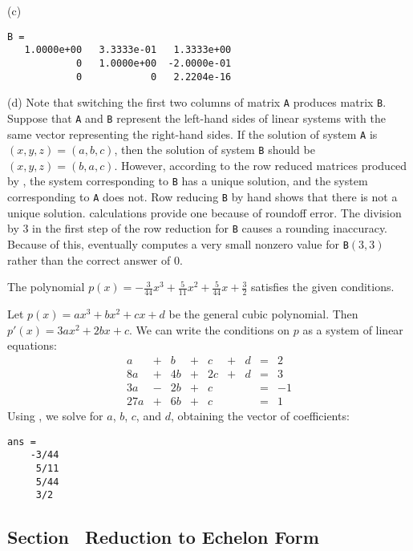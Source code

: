 \documentclass{ximera}
\begin{document}
(c)
\begin{verbatim}
B =
   1.0000e+00   3.3333e-01   1.3333e+00
            0   1.0000e+00  -2.0000e-01
            0            0   2.2204e-16
\end{verbatim}


(d) Note that switching the first two columns of matrix {\tt A} produces
matrix {\tt B}.  Suppose that {\tt A} and {\tt B} represent the left-hand
sides of linear systems with the same vector representing the right-hand
sides.  If the solution of system {\tt A} is $(x,y,z) = (a,b,c)$, then the
solution of system {\tt B} should be $(x,y,z) = (b,a,c)$.  However,
according to the row reduced matrices produced by \Matlab, the system
corresponding to {\tt B} has a unique solution, and the system
corresponding to {\tt A} does not.  Row reducing {\tt B} by hand shows
that there is not a unique solution.  \Matlab calculations provide one because of 
roundoff error.  The division by 3 in the first step of the row reduction
for {\tt B} causes a rounding inaccuracy.  Because of this, \Matlab
eventually computes a very small nonzero value for {\tt B}$(3,3)$
rather than the correct answer of 0.

\ans The polynomial $p(x) = -\frac{3}{44}x^3 + \frac{5}{11}x^2 +
\frac{5}{44}x + \frac{3}{2}$ satisfies the given conditions.

\soln Let $p(x) = ax^3 + bx^2 + cx + d$ be the general cubic polynomial. 
Then $p'(x) = 3ax^2 + 2bx + c$.  We can write the conditions on $p$ as a
system of linear equations:
\[
\begin{array}{rrrrrrrrr}
a & + & b & + & c & + & d & = & 2 \\
8a & + & 4b & + & 2c & + & d & = & 3 \\
3a & - & 2b & + & c & & & = & -1 \\
27a & + & 6b & + & c & & & = & 1\end{array}
\]
Using \Matlab, we solve for $a$, $b$, $c$, and $d$, obtaining the
vector of coefficients:
\begin{verbatim}
ans =
    -3/44
     5/11
     5/44
     3/2
\end{verbatim}





\subsection*{Section~\protect{\ref{S:2.4}} Reduction to Echelon Form}
\end{document}
